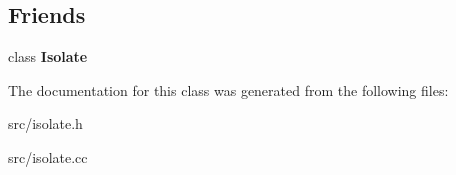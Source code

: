 \subsection*{Friends}
\begin{DoxyCompactItemize}
\item 
\hypertarget{classv8_1_1internal_1_1_thread_id_aba4f0964bdacf2bbf62cf876e5d28d0a}{}class {\bfseries Isolate}\label{classv8_1_1internal_1_1_thread_id_aba4f0964bdacf2bbf62cf876e5d28d0a}

\end{DoxyCompactItemize}


The documentation for this class was generated from the following files\+:\begin{DoxyCompactItemize}
\item 
src/isolate.\+h\item 
src/isolate.\+cc\end{DoxyCompactItemize}
